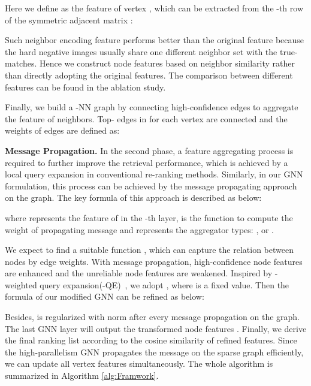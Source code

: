 \documentclass[10pt,twocolumn,letterpaper]{article}
\begin{document}
Here we define  as the feature of vertex , which can be extracted from the -th row of the symmetric adjacent matrix :

Such neighbor encoding feature performs better than the original feature because the hard negative images usually share one different neighbor set with the true-matches. 
Hence we construct node features based on neighbor similarity rather than directly adopting the original features. The comparison between different features can be found in the ablation study. 

Finally, we build a -NN graph by connecting high-confidence edges to aggregate the feature of neighbors. Top- edges in  for each vertex are connected and the  weights of edges are defined as:


\noindent  \textbf{Message Propagation.}
In the second phase, a feature aggregating process is required to further improve the retrieval performance, which is achieved by a local query expansion in conventional re-ranking methods. 
Similarly, in our GNN formulation, this process can be achieved by the message propagating approach~\cite{gilmer2017neural} on the graph. The key formula of this approach is described as below:

where  represents the feature of   in the -th layer,  is the function to compute the weight of propagating message and   represents the aggregator types: ,  or .

We expect to find a suitable function , which can capture the relation between nodes by edge weights. With message propagation, high-confidence node features are enhanced and the unreliable node features are weakened.
Inspired by -weighted query expansion(-QE)~\cite{radenovic2018fine}, we adopt , where  is a fixed value. 
Then the formula of our modified GNN can be refined as below:

  
Besides,   is regularized with  norm after every message propagation on the graph. The last GNN layer will output the transformed node features . Finally,
we derive the final ranking list according to the cosine similarity of refined features. 
Since the high-parallelism GNN propagates the message on the sparse graph efficiently, we can update all vertex features simultaneously.
The whole algorithm is summarized in Algorithm \ref{alg:Framwork}.
\end{document}
